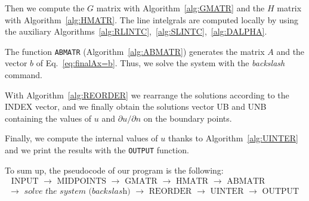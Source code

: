 Then we compute the $G$ matrix with Algorithm~\ref{alg:GMATR} and the $H$ matrix with Algorithm~\ref{alg:HMATR}. The line intelgrals are computed locally by using the auxiliary Algorithms~\ref{alg:RLINTC},~\ref{alg:SLINTC},~\ref{alg:DALPHA}.

The function \texttt{ABMATR} (Algorithm~\ref{alg:ABMATR}) generates the matrix $A$ and the vector $b$ of Eq.~\eqref{eq:finalAx=b}. Thus, we solve the system with the \emph{backslash} command. 

With Algorithm~\ref{alg:REORDER} we rearrange the solutions according to the INDEX vector, and we finally obtain the solutions vector UB and UNB containing the values of $u$ and $\partial u / \partial n$ on the boundary points.

Finally, we compute the internal values of $u$ thanks to Algorithm~\ref{alg:UINTER} and we print the results with the \texttt{OUTPUT} function.

To sum up, the pseudocode of our program is the following:
\begin{equation}
\label{eq:flowchart}
\begin{gathered}
\text{ INPUT } \to \text{ MIDPOINTS } \to \text{ GMATR } \to \text{ HMATR } \to \text{ ABMATR } \\
 \to \textit{ solve the system (backslash) } \to \text{ REORDER } \to \text{ UINTER } \to \text{ OUTPUT }  
\end{gathered}
\end{equation}

\newpage

